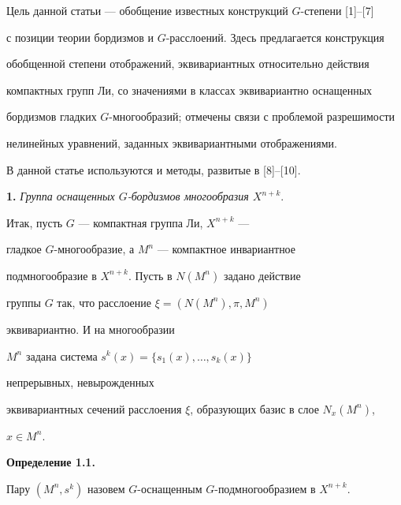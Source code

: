\maketitle 


\label{begin} 


 


 


 


Цель данной статьи --- обобщение известных конструкций $G$-степени [1]--[7] 


с позиции теории бордизмов и $G$-расслоений. Здесь предлагается конструкция 


обобщенной степени отображений, эквивариантных относительно действия 


компактных групп Ли, со значениями в классах эквивариантно оснащенных 


бордизмов гладких $G$-многообразий; отмечены связи с проблемой разрешимости 


нелинейных уравнений, заданных эквивариантными отображениями. 


В данной статье используются и методы, развитые в [8]--[10]. 


\medskip 


 


{\bf 1.} {\it Группа оснащенных $G$-бордизмов многообразия $X^{n+k}$}. 


Итак, пусть $G$ --- компактная группа Ли, $X^{n+k}$ --- 


гладкое $G$-многообразие, а $M^n$ --- компактное инвариантное 


подмногообразие в $X^{n+k}$. Пусть в $N(M^n)$ задано действие 


группы $G$ так, что расслоение $\xi=(N(M^n),\pi,M^n)$ 


эквивариантно. И на многообразии 


$M^n$ задана система $s^k(x)=\{s_1(x),\dotsc,s_k(x)\}$ 


непрерывных, невырожденных 


эквивариантных сечений расслоения $\xi$, образующих базис в слое $N_x(M^n)$, 


$x\in M^n$. 


\medskip 


 


{\bf Определение 1.1.} 


Пару $(M^n,s^k)$ назовем $G$-оснащенным $G$-подмногообразием в $X^{n+k}$. 



